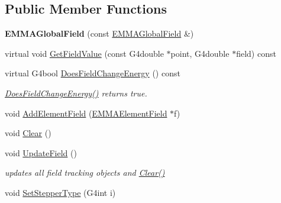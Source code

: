 \subsection*{Public Member Functions}
\begin{DoxyCompactItemize}
\item 
\hypertarget{classEMMAGlobalField_aa9210ce2f1f4f7b84c59dacb2ddaa4f4}{{\bfseries E\-M\-M\-A\-Global\-Field} (const \hyperlink{classEMMAGlobalField}{E\-M\-M\-A\-Global\-Field} \&)}\label{classEMMAGlobalField_aa9210ce2f1f4f7b84c59dacb2ddaa4f4}

\item 
virtual void \hyperlink{classEMMAGlobalField_ac88fc8d757a71e47c720d9954a575d92}{Get\-Field\-Value} (const G4double $\ast$point, G4double $\ast$field) const 
\item 
\hypertarget{classEMMAGlobalField_a92e2746d98c6504ff36881afd3a96628}{virtual G4bool \hyperlink{classEMMAGlobalField_a92e2746d98c6504ff36881afd3a96628}{Does\-Field\-Change\-Energy} () const }\label{classEMMAGlobalField_a92e2746d98c6504ff36881afd3a96628}

\begin{DoxyCompactList}\small\item\em \hyperlink{classEMMAGlobalField_a92e2746d98c6504ff36881afd3a96628}{Does\-Field\-Change\-Energy()} returns true. \end{DoxyCompactList}\item 
void \hyperlink{classEMMAGlobalField_a42a0c7aa1746b0f11c3be62e7c7da49c}{Add\-Element\-Field} (\hyperlink{classEMMAElementField}{E\-M\-M\-A\-Element\-Field} $\ast$f)
\item 
void \hyperlink{classEMMAGlobalField_a82ae7d2395858dbc63145e1f00a73c72}{Clear} ()
\item 
\hypertarget{classEMMAGlobalField_a89ebf29cff77048404ea6955333d5ae3}{void \hyperlink{classEMMAGlobalField_a89ebf29cff77048404ea6955333d5ae3}{Update\-Field} ()}\label{classEMMAGlobalField_a89ebf29cff77048404ea6955333d5ae3}

\begin{DoxyCompactList}\small\item\em updates all field tracking objects and \hyperlink{classEMMAGlobalField_a82ae7d2395858dbc63145e1f00a73c72}{Clear()} \end{DoxyCompactList}\item 
\hypertarget{classEMMAGlobalField_affba41c140eb80d7815e659e8633da3f}{void \hyperlink{classEMMAGlobalField_affba41c140eb80d7815e659e8633da3f}{Set\-Stepper\-Type} (G4int i)}\label{classEMMAGlobalField_affba41c140eb80d7815e659e8633da3f}


\end{DoxyCompactItemize}

